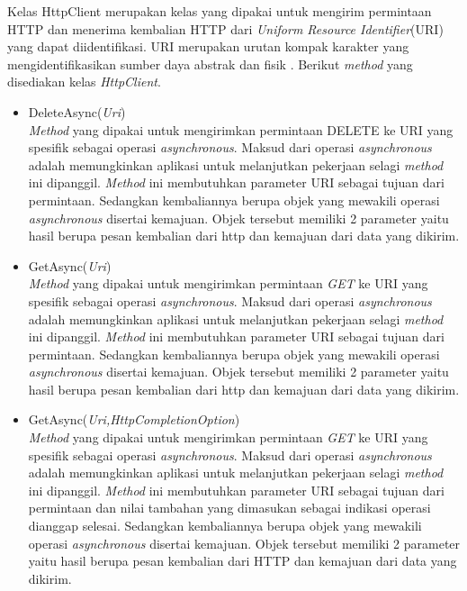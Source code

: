 \hspace{0.5cm} Kelas HttpClient merupakan kelas yang dipakai untuk mengirim permintaan HTTP dan menerima kembalian HTTP dari \textit{Uniform Resource Identifier}(URI) yang dapat diidentifikasi. URI merupakan urutan kompak karakter yang mengidentifikasikan sumber daya abstrak dan fisik \cite{rfc3986}. Berikut \textit{method} yang disediakan kelas \textit{HttpClient}.
\begin{itemize}
	\item DeleteAsync(\textit{Uri}) \\
	\textit{Method} yang dipakai untuk mengirimkan permintaan DELETE ke URI yang spesifik sebagai operasi \textit{asynchronous}. Maksud dari operasi \textit{asynchronous} adalah memungkinkan aplikasi untuk melanjutkan pekerjaan selagi \textit{method} ini dipanggil\footnotemark[2]. \textit{Method} ini membutuhkan parameter URI sebagai tujuan dari permintaan. Sedangkan kembaliannya berupa objek yang mewakili operasi \textit{asynchronous} disertai kemajuan. Objek tersebut memiliki 2 parameter yaitu hasil berupa pesan kembalian dari http dan kemajuan dari data yang dikirim.
	\item GetAsync(\textit{Uri}) \\
	\textit{Method} yang dipakai untuk mengirimkan permintaan \textit{GET} ke URI yang spesifik sebagai operasi \textit{asynchronous}. Maksud dari operasi \textit{asynchronous} adalah memungkinkan aplikasi untuk melanjutkan pekerjaan selagi \textit{method} ini dipanggil\footnotemark[2]. \textit{Method} ini membutuhkan parameter URI sebagai tujuan dari permintaan. Sedangkan kembaliannya berupa objek yang mewakili operasi \textit{asynchronous} disertai kemajuan. Objek tersebut memiliki 2 parameter yaitu hasil berupa pesan kembalian dari http dan kemajuan dari data yang dikirim.
	\item GetAsync(\textit{Uri,HttpCompletionOption}) \\
	\textit{Method} yang dipakai untuk mengirimkan permintaan \textit{GET} ke URI yang spesifik sebagai operasi \textit{asynchronous}. Maksud dari operasi \textit{asynchronous} adalah memungkinkan aplikasi untuk melanjutkan pekerjaan selagi \textit{method} ini dipanggil\footnotemark[2]. \textit{Method} ini membutuhkan parameter URI sebagai tujuan dari permintaan dan nilai tambahan yang dimasukan sebagai indikasi operasi dianggap selesai. Sedangkan kembaliannya berupa objek yang mewakili operasi \textit{asynchronous} disertai kemajuan. Objek tersebut memiliki 2 parameter yaitu hasil berupa pesan kembalian dari HTTP dan kemajuan dari data yang dikirim.

\end{itemize}

